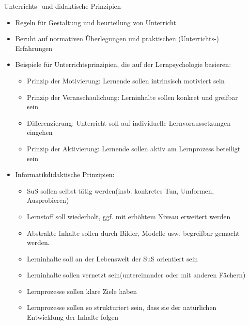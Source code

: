 \documentclass{article}
\begin{document}
\begin{block}{Unterrichts- und didaktische Prinzipien}
    \begin{itemize}
        \item Regeln für Gestaltung und beurteilung von Unterricht
        \item Beruht auf normativen Überlegungen und praktischen (Unterrichts-) Erfahrungen
        \item Beispiele für Unterrichtsprinzipien, die auf der Lernpsychologie basieren:
        \begin{itemize}
            \item Prinzip der Motivierung: Lernende sollen intrinsisch motiviert sein
            \item Prinzip der Veranschaulichung: Lerninhalte sollen konkret und greifbar sein
            \item Differenzierung: Unterricht soll auf individuelle Lernvoraussetzungen eingehen
            \item Prinzip der Aktivierung: Lernende sollen aktiv am Lernprozess beteiligt sein
        \end{itemize}
        \item Informatikdidaktische Prinzipien:
        \begin{itemize}
            \item SuS sollen selbst tätig werden(insb. konkretes Tun, Umformen, Ausprobieren)
            \item Lernstoff soll wiederholt, ggf. mit erhöhtem Niveau erweitert werden
            \item Abstrakte Inhalte sollen durch Bilder, Modelle usw. begreifbar gemacht werden.
            \item Lerninhalte soll an der Lebenswelt der SuS orientiert sein
            \item Lerninhalte sollen vernetzt sein(untereinander oder mit anderen Fächern)
            \item Lernprozesse sollen klare Ziele haben
            \item Lernprozesse sollen so strukturiert sein, dass sie der natürlichen Entwicklung der Inhalte folgen
        \end{itemize}
    \end{itemize}
\end{block}
\end{document}
